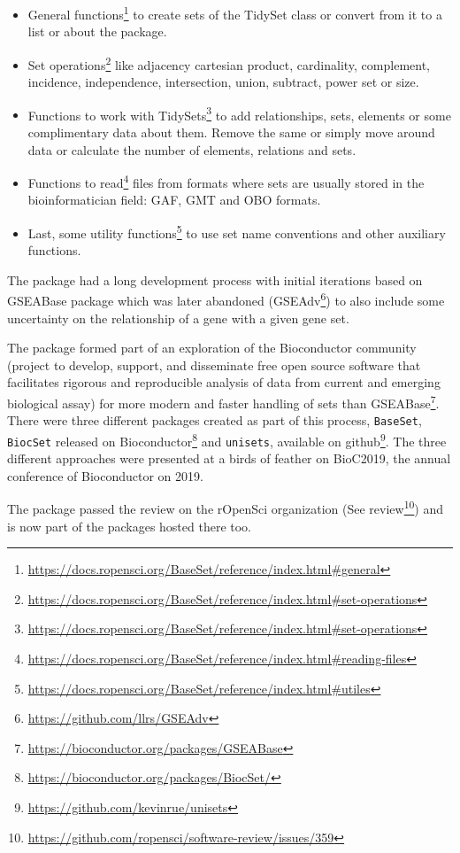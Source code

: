 \documentclass[
  12pt,
  a4paper,
  twoside,
  openright]{book}
\DeclareRobustCommand{\href}[2]{#2\footnote{\url{#1}}}
\begin{document}
\begin{itemize}
\item
  \href{https://docs.ropensci.org/BaseSet/reference/index.html\#general}{General functions} to create sets of the TidySet class or convert from it to a list or about the package.
\item
  \href{https://docs.ropensci.org/BaseSet/reference/index.html\#set-operations}{Set operations} like adjacency cartesian product, cardinality, complement, incidence, independence, intersection, union, subtract, power set or size.
\item
  \href{https://docs.ropensci.org/BaseSet/reference/index.html\#set-operations}{Functions to work with TidySets} to add relationships, sets, elements or some complimentary data about them.
  Remove the same or simply move around data or calculate the number of elements, relations and sets.
\item
  \href{https://docs.ropensci.org/BaseSet/reference/index.html\#reading-files}{Functions to read} files from formats where sets are usually stored in the bioinformatician field: GAF, GMT and OBO formats.
\item
  Last, some \href{https://docs.ropensci.org/BaseSet/reference/index.html\#utiles}{utility functions} to use set name conventions and other auxiliary functions.
\end{itemize}

The package had a long development process with initial iterations based on GSEABase package which was later abandoned (\href{https://github.com/llrs/GSEAdv}{GSEAdv}) to also include some uncertainty on the relationship of a gene with a given gene set.

The package formed part of an exploration of the Bioconductor community (project to develop, support, and disseminate free open source software that facilitates rigorous and reproducible analysis of data from current and emerging biological assay) for more modern and faster handling of sets than \href{https://bioconductor.org/packages/GSEABase}{GSEABase}.
There were three different packages created as part of this process, \texttt{BaseSet}, \texttt{BiocSet} released \href{https://bioconductor.org/packages/BiocSet/}{on Bioconductor} and \texttt{unisets}, available \href{https://github.com/kevinrue/unisets}{on github}.
The three different approaches were presented at a birds of feather on BioC2019, the annual conference of Bioconductor on 2019.

The package passed the review on the rOpenSci organization (\href{https://github.com/ropensci/software-review/issues/359}{See review}) and is now part of the packages hosted there too.
\end{document}
